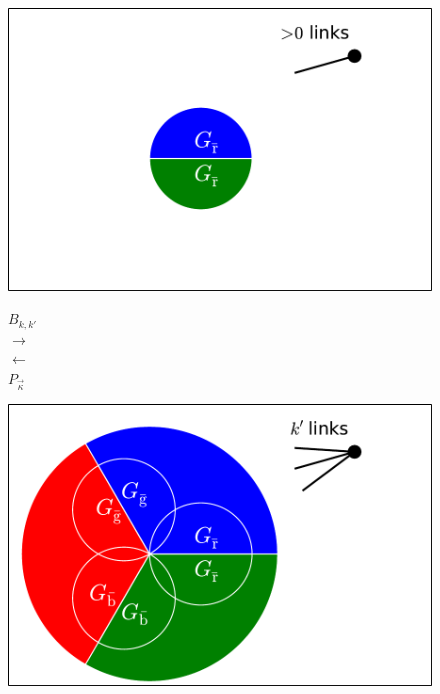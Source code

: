 \documentclass[aps, pre, onecolumn, a4paper, floatfix]{revtex4}
\begin{document}
\begin{figure}[htb]
\begin{minipage}[b]{0.35\linewidth}
\begin{center}
    \includegraphics[trim=0 0 0 190,clip,width=0.99\columnwidth]{sets_k_gc_no_1.pdf}
   \end{center}
  \end{minipage}
  \begin{minipage}[b]{0.1\linewidth}
    \begin{center}
      $B_{k,k'}$\\
      {\huge $\longrightarrow$\\}
      \vspace{50mm}
      {\huge$\longleftarrow$\\}
      \vspace{3mm}
      $P_{\vec \kappa}$\\
      \vspace{30mm}
    \end{center}
  \end{minipage}
  \begin{minipage}[b]{0.35\linewidth}
    \begin{center}
    \includegraphics[width=0.99\columnwidth]{sets_k_gc.pdf}\\

\end{center}
\end{minipage}
\end{figure}
\end{document}
